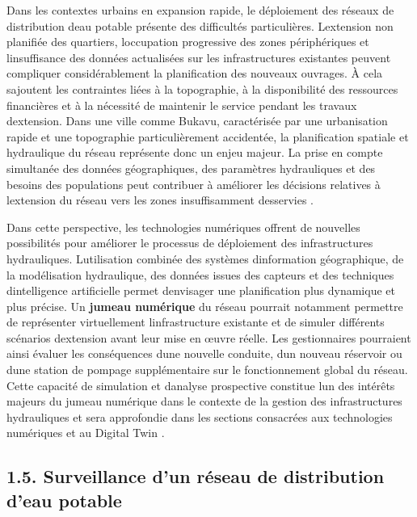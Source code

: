\documentclass[12pt,a4paper,oneside]{report}
\begin{document}
Dans les contextes urbains en expansion rapide, le déploiement des
réseaux de distribution d\textquotesingle eau potable présente des
difficultés particulières. L\textquotesingle extension non planifiée des
quartiers, l\textquotesingle occupation progressive des zones
périphériques et l\textquotesingle insuffisance des données actualisées
sur les infrastructures existantes peuvent compliquer considérablement
la planification des nouveaux ouvrages. À cela
s\textquotesingle ajoutent les contraintes liées à la topographie, à la
disponibilité des ressources financières et à la nécessité de maintenir
le service pendant les travaux d\textquotesingle extension. Dans une
ville comme Bukavu, caractérisée par une urbanisation rapide et une
topographie particulièrement accidentée, la planification spatiale et
hydraulique du réseau représente donc un enjeu majeur. La prise en
compte simultanée des données géographiques, des paramètres hydrauliques
et des besoins des populations peut contribuer à améliorer les décisions
relatives à l\textquotesingle extension du réseau vers les zones
insuffisamment desservies \cite{ref43}.

Dans cette perspective, les technologies numériques offrent de nouvelles
possibilités pour améliorer le processus de déploiement des
infrastructures hydrauliques. L\textquotesingle utilisation combinée des
systèmes d\textquotesingle information géographique, de la modélisation
hydraulique, des données issues des capteurs et des techniques
d\textquotesingle intelligence artificielle permet
d\textquotesingle envisager une planification plus dynamique et plus
précise. Un \textbf{jumeau numérique} du réseau pourrait notamment
permettre de représenter virtuellement l\textquotesingle infrastructure
existante et de simuler différents scénarios d\textquotesingle extension
avant leur mise en œuvre réelle. Les gestionnaires pourraient ainsi
évaluer les conséquences d\textquotesingle une nouvelle conduite,
d\textquotesingle un nouveau réservoir ou d\textquotesingle une station
de pompage supplémentaire sur le fonctionnement global du réseau. Cette
capacité de simulation et d\textquotesingle analyse prospective
constitue l\textquotesingle un des intérêts majeurs du jumeau numérique
dans le contexte de la gestion des infrastructures hydrauliques et sera
approfondie dans les sections consacrées aux technologies numériques et
au Digital Twin \cite{ref17}.

\subsection{1.5. Surveillance d'un réseau de distribution d'eau
potable}\label{surveillance-dun-ruxe9seau-de-distribution-deau-potable}
\end{document}
